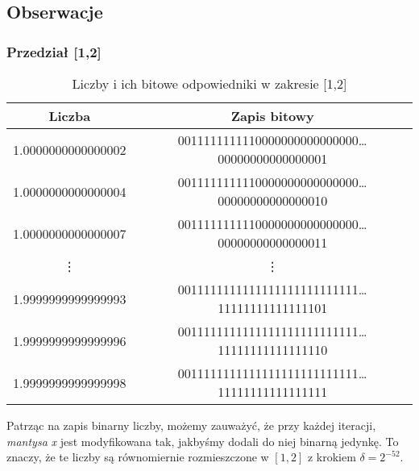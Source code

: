 \documentclass{article}
\begin{document}
        \subsection{Obserwacje}
            \subsubsection{Przedział [1,2]}
                {\small
                \begin{table}[h!]
                \centering
                \begin{tabular}{c c}
                    \hline
                     Liczba & Zapis bitowy\\
                     \hline
                    1.0000000000000002 & 0011111111110000000000000000\dots00000000000000001 \\
                    1.0000000000000004 & 0011111111110000000000000000\dots00000000000000010 \\
                    1.0000000000000007 & 0011111111110000000000000000\dots00000000000000011 \\
                    \vdots & \vdots \\
                    1.9999999999999993 & 0011111111111111111111111111\dots11111111111111101 \\
                    1.9999999999999996 & 0011111111111111111111111111\dots11111111111111110 \\
                    1.9999999999999998 & 0011111111111111111111111111\dots11111111111111111 \\
                     \hline
                \end{tabular}
                \caption{Liczby i ich bitowe odpowiedniki w zakresie [1,2]}
                \label{table:range:onetwo}
                \end{table}
                }
                Patrząc na zapis binarny liczby, możemy zauważyć, że przy każdej iteracji, \textit{mantysa} \textit{x} jest modyfikowana tak, jakbyśmy dodali do niej binarną jedynkę. To znaczy, że te liczby są równomiernie rozmieszczone w $[1,2]$ z krokiem $\delta=2^{-52}$.
\end{document}
